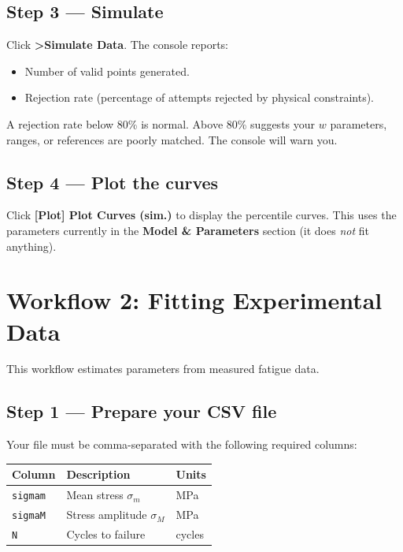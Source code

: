 \documentclass[11pt,a4paper]{article}
\newcommand{\sm}{\ensuremath{\sigma_m}}
\newcommand{\sM}{\ensuremath{\sigma_M}}
\begin{document}
\subsection{Step 3 --- Simulate}

Click \textbf{\textcolor{greenhl}{\textgreater Simulate Data}}. The console reports:
\begin{itemize}[leftmargin=1.4em]
  \item Number of valid points generated.
  \item Rejection rate (percentage of attempts rejected by physical constraints).
\end{itemize}

\begin{tipbox}
A rejection rate below 80\% is normal. Above 80\% suggests your $w$ parameters, ranges, or references are poorly matched. The console will warn you.
\end{tipbox}

\subsection{Step 4 --- Plot the curves}

Click \textbf{\textcolor{accent}{\textbf{[Plot]} Plot Curves (sim.)}} to display the percentile curves. This uses the parameters currently in the \textbf{Model \& Parameters} section (it does \emph{not} fit anything).

\section{Workflow 2: Fitting Experimental Data}

This workflow estimates parameters from measured fatigue data.

\subsection{Step 1 --- Prepare your CSV file}

Your file must be comma-separated with the following required columns:

\begin{center}
\begin{tabular}{lll}
\toprule
\textbf{Column} & \textbf{Description} & \textbf{Units} \\
\midrule
\texttt{sigmam} & Mean stress $\sm$ & MPa \\
\texttt{sigmaM} & Stress amplitude $\sM$ & MPa \\
\texttt{N} & Cycles to failure & cycles \\
\bottomrule
\end{tabular}
\end{center}
\end{document}
